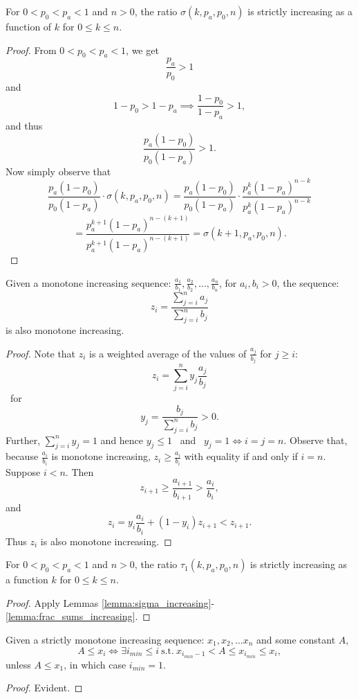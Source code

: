 \begin{lemma}
    \label{lemma:sigma_increasing}
For $0<p_0< p_a< 1$ and $n>0$, the ratio $\sigma(k,p_a,p_0,n)$ is strictly increasing as a function of $k$ for $0\le k\le n$.
\end{lemma}
\begin{proof}
From $0<p_0< p_a< 1$, we get
$$
\frac{p_a}{p_0}>1
$$
and
$$
1-p_0>1-p_a\implies \frac{1-p_0}{1-p_a}>1,
$$
and thus
$$
\frac{p_a(1-p_0)}{p_0(1-p_a)}>1.
$$
Now simply observe that
$$
\frac{p_a(1-p_0)}{p_0(1-p_a)}\cdot\sigma(k, p_a, p_0, n)
=\frac{p_a(1-p_0)}{p_0(1-p_a)}\cdot\frac{p_a^{k} (1-p_a)^{n-k}}{p_a^{k} (1-p_a)^{n-k}}
$$$$
=\frac{p_a^{k+1} (1-p_a)^{n-(k+1)}}{p_a^{k+1} (1-p_a)^{n-(k+1)}}
=\sigma(k+1, p_a, p_0, n).
$$
\end{proof}

\begin{lemma}
    \label{lemma:frac_sums_increasing}
    Given a monotone increasing sequence: $\frac{a_1}{b_1}, \frac{a_2}{b_2}, \ldots, \frac{a_n}{b_n}$, for $a_i, b_i > 0$, the sequence:
    $$z_i = \frac{\sum_{j=i}^n a_j}{\sum_{j=i}^n b_j}$$
    is also monotone increasing.
\end{lemma}

\begin{proof}
    Note that $z_i$ is a weighted average of the values of $\frac{a_j}{b_j}$ for $j \geq i$:
    $$z_i = \sum_{j=i}^n y_j \frac{a_j}{b_j}$$  ~for~ $$y_j = \frac{b_j}{\sum _{j=i}^n b_j} > 0.$$
    Further, $\sum _{j=i}^n y_j = 1$ and hence  $y_j \leq 1$ ~and~ $y_j = 1 \Leftrightarrow i=j=n$.
    Observe that, because $\frac{a_i}{b_i}$ is monotone increasing,
    $z_i \geq \frac{a_i}{b_i}$
    with equality if and only if $i=n$.
    Suppose $i < n$. Then
    $$z_{i+1} \geq \frac{a_{i+1}}{b_{i+1}} > \frac{a_i}{b_i}, $$
    and
    $$z_i = y_i \frac{a_i}{b_i} + (1-y_i) z_{i+1} < z_{i+1}.$$
    Thus $z_i$ is also monotone increasing.
\end{proof}

\begin{lemma}
    \label{lemma:tau1_increasing}
For $0<p_0< p_a< 1$ and $n>0$, the ratio $\tau_1(k,p_a,p_0,n)$ is strictly increasing as a function $k$ for $0\le k\le n$.
\end{lemma}
\begin{proof}
    Apply Lemmas \ref{lemma:sigma_increasing}-\ref{lemma:frac_sums_increasing}.
\end{proof}
\begin{lemma}
    \label{lemma:imin-exists}
    Given a strictly monotone increasing sequence: $x_1, x_2, \ldots x_n $ and some constant $A$,
    $$A \le x_i \Leftrightarrow \exists i_{min} \le i ~\text{s.t.}~   x_{i_{min} -1} < A \le x_{i_{min}} \le x_{i},$$
    unless $A\le x_1$, in which case $i_{min} =1 $.
\end{lemma}
\begin{proof}
    Evident.
\end{proof}

